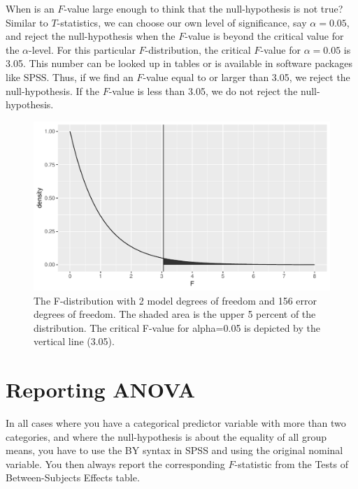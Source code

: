 \documentclass[]{report}\usepackage[]{graphicx}\usepackage[]{color}
\makeatletter
\def\maxwidth{ %
  \ifdim\Gin@nat@width>\linewidth
    \linewidth
  \else
    \Gin@nat@width
  \fi
}
\newenvironment{knitrout}{}{} %
\makeatother
\begin{document}
When is an $F$-value large enough to think that the null-hypothesis is not true? Similar to $T$-statistics, we can choose our own level of significance, say $\alpha=0.05$, and reject the null-hypothesis when the $F$-value is beyond the critical value for the $\alpha$-level. For this particular $F$-distribution, the critical $F$-value for $\alpha=0.05$ is 3.05. This number can be looked up in tables or is available in software packages like SPSS. Thus, if we find an $F$-value equal to or larger than 3.05, we reject the null-hypothesis. If the $F$-value is less than 3.05, we do not reject the null-hypothesis. 

\begin{knitrout}
\color{fgcolor}\begin{figure}

{\centering \includegraphics[width=\maxwidth]{figure/dummy_23-1} 

}

\caption[The F-distribution with 2 model degrees of freedom and 156 error degrees of freedom]{The F-distribution with 2 model degrees of freedom and 156 error degrees of freedom. The shaded area is the upper 5 percent of the distribution. The critical F-value for alpha=0.05 is depicted by the vertical line (3.05).}\label{fig:dummy_23}
\end{figure}


\end{knitrout}




\section{Reporting ANOVA}
In all cases where you have a categorical predictor variable with more than two categories, and where the null-hypothesis is about the equality of all group means, you have to use the BY syntax in SPSS and using the original nominal variable. You then always report the corresponding $F$-statistic from the Tests of Between-Subjects Effects table. 
\end{document}
